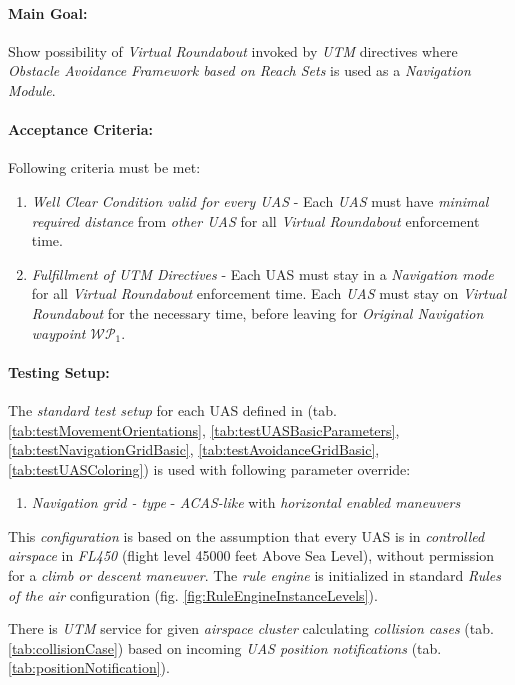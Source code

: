 \paragraph{Main Goal:} Show possibility of \emph{Virtual Roundabout} invoked by \emph{UTM} directives where \emph{Obstacle Avoidance Framework based on Reach Sets} is used as a \emph{Navigation Module}.

\paragraph{Acceptance  Criteria:} Following criteria must be met:

\begin{enumerate}
	\item \emph{Well Clear Condition valid for every UAS} - Each \emph{UAS} must have \emph{minimal required distance} from \emph{other UAS} for all \emph{Virtual Roundabout} enforcement time.
	
	\item \emph{Fulfillment of UTM Directives} - Each UAS must stay in a \emph{Navigation mode} for all \emph{Virtual Roundabout} enforcement time. Each \emph{UAS} must stay on \emph{Virtual Roundabout} for the necessary time, before leaving for \emph{Original Navigation waypoint $\mathscr{WP}_1$}.
\end{enumerate}

\paragraph{Testing Setup:} The \emph{standard test setup} for each UAS defined in (tab. \ref{tab:testMovementOrientations}, \ref{tab:testUASBasicParameters}, \ref{tab:testNavigationGridBasic}, \ref{tab:testAvoidanceGridBasic}, \ref{tab:testUASColoring}) is used with following parameter override:
\begin{enumerate}
	\item \emph{Navigation grid - type} - \emph{ACAS-like} with \emph{horizontal enabled maneuvers}
\end{enumerate}

This \emph{configuration} is based on the assumption that every UAS is in \emph{controlled airspace} in \emph{FL450} (flight level 45000 feet Above Sea Level), without permission for a \emph{climb or descent maneuver}. The \emph{rule engine} is initialized in standard \emph{Rules of the air} configuration (fig. \ref{fig:RuleEngineInstanceLevels}).

There is \emph{UTM} service for given \emph{airspace cluster} calculating \emph{collision cases} (tab. \ref{tab:collisionCase}) based on incoming \emph{UAS position notifications} (tab. \ref{tab:positionNotification}).

